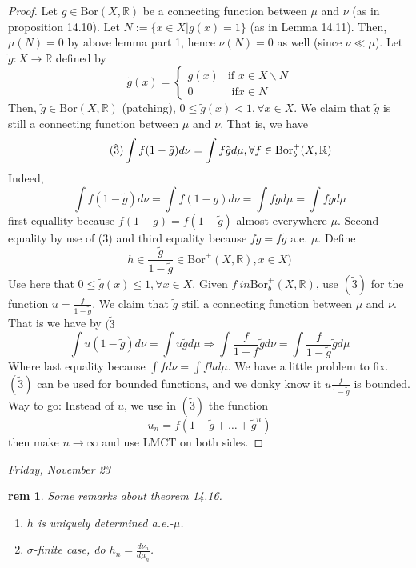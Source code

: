\documentclass[letterpaper, 12pt]{article}
\newcommand{\fin}{\qquad \quad \hfill \framebox[1.75mm][l]{\,}}
\newcommand{\bR}{\mathbb{R}}
\newcommand{\Bor}{\mathrm{Bor}}
\theoremstyle{stdthm}
\theoremstyle{stddef}
\newtheorem{rem}[thm]{rem} %
\theoremstyle{stdnonum}
\theoremstyle{stdqands}
\theoremstyle{stdbold}
\begin{document}
\begin{proof}
Let $g \in \Bor(X, \bR)$ be a connecting function between $\mu$ and $\nu$ (as in proposition 14.10). Let $N:= \{x \in X| g(x) = 1\}$ (as in Lemma 14.11). Then, $\mu(N)=0$ by above lemma part 1, hence $\nu(N) = 0$ as well (since $\nu \ll \mu$). Let $\tilde{g}: X \to \bR$ defined by 
\[ \tilde{g}(x) = 
\begin{cases}
g(x) & \mbox{if } x\in X \backslash N\\
0 & \mbox{ if} x \in N
\end{cases} \]
Then, $\tilde{g} \in \Bor(X,\bR)$ (patching), $ 0 \leq \tilde{g}(x) <1, \forall x \in X$. We claim that $\tilde{g}$ is still a connecting function between $\mu$ and $\nu$. That is, we have 
\[ \tag{$\tilde{3}$} \int f(1-\tilde{g}) d\nu = \int f \tilde{g} d\mu, \forall f \in \Bor^+_b(X,\bR)\]
Indeed, 
\[\int f(1-\tilde{g}) d\nu = \int f(1-g) d\nu = \int fg d\mu = \int f\tilde{g} d\mu  \]
 first equallity because $f(1-g) = f(1-\tilde{g})$ almost everywhere $\mu$. Second equality by use of (3) and third equality because $fg = f\tilde{g}$ a.e. $\mu$. Define 
 \[ h \in \frac{\tilde{g}}{1-\tilde{g}} \in \Bor^+(X,\bR), x \in X) \]
 Use  here that $ 0 \leq \tilde{g}(x) \leq 1, \forall x \in X$. Given $f\ in \Bor^+_b(X,\bR)$, use $(\tilde{3})$ for the function $u =\frac{f}{1 - \tilde{g}}$. We claim that $\tilde{g}$ still a connecting function between $\mu$ and $\nu$. That is we have  by $(\tilde{3}$
 \[ \int u (1- \tilde{g}) d\nu = \int u \tilde{g} d\mu \Rightarrow \int \frac{f}{1-f} \tilde{g} d\nu = \int \frac{f}{1-\tilde{g}} \tilde{g} d\mu \]
 Where last equality because $\int f d\nu = \int fh d\mu$. We have a little problem to fix. $(\tilde{3})$ can be used for bounded functions, and we donky know it $u \frac{f}{1-\tilde{g}}$ is bounded. Way to go: Instead of $u$, we use in $(\tilde{3})$ the function 
 \[ u_n = f(1+ \tilde{g} + \dots + \tilde{g}^n) \]
 then make $n \rightarrow \infty$ and use LMCT on both sides. 
\end{proof}

\begin{center}
\emph{Friday, November 23}
\end{center}

\begin{rem}
Some remarks about theorem 14.16. 
\begin{enumerate}
\item $h$ is uniquely determined a.e.-$\mu$. 
\item $\sigma$-finite case, do $h_n = \frac{d \nu_n}{d \mu_n}$. 
\end{enumerate}

\end{rem}
\end{document}
